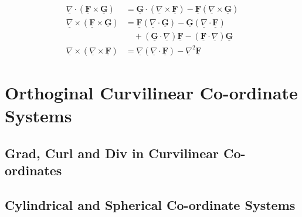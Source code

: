 \documentclass{article}
\renewcommand{\vec}[1]{\underline{\textbf{#1}}}
\newcommand{\nab}{\underline{\nabla}}
\renewcommand{\div}{\nab \cdot}
\newcommand{\curl}{\nab \times}
\begin{document}
\begin{align}
  \div(\vec F\times \vec G) &= \vec G \cdot(\curl\vec F) - \vec F(\curl \vec G)\\
  \curl(\vec F\times \vec G) &= \vec F(\div \vec G) - \vec G(\div \vec F)\\
  &\quad + (\vec G \cdot\nab)\vec F - (\vec F \cdot\nab)\vec G\\
  \curl(\curl\vec F) &= \nab(\div\vec F) - \nab^2\vec F
\end{align}


\section{Orthoginal Curvilinear Co-ordinate Systems}


\subsection{Grad, Curl and Div in Curvilinear Co-ordinates}


\subsection{Cylindrical and Spherical Co-ordinate Systems}
\end{document}
